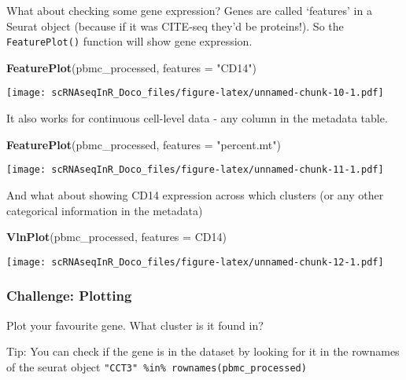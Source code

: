 \documentclass[
]{book}
\newenvironment{Shaded}{\begin{snugshade}}{\end{snugshade}}
\newcommand{\AttributeTok}[1]{\textcolor[rgb]{0.13,0.29,0.53}{#1}}
\newcommand{\FunctionTok}[1]{\textcolor[rgb]{0.13,0.29,0.53}{\textbf{#1}}}
\newcommand{\NormalTok}[1]{#1}
\newcommand{\StringTok}[1]{\textcolor[rgb]{0.31,0.60,0.02}{#1}}
\begin{document}
What about checking some gene expression? Genes are called `features' in a Seurat object (because if it was CITE-seq they'd be proteins!). So the \texttt{FeaturePlot()} function will show gene expression.

\begin{Shaded}
\begin{Highlighting}[]
\FunctionTok{FeaturePlot}\NormalTok{(pbmc\_processed, }\AttributeTok{features =}  \StringTok{"CD14"}\NormalTok{)}
\end{Highlighting}
\end{Shaded}

\texttt{[image: scRNAseqInR\_Doco\_files/figure-latex/unnamed-chunk-10-1.pdf]}

It also works for continuous cell-level data - any column in the metadata table.

\begin{Shaded}
\begin{Highlighting}[]
\FunctionTok{FeaturePlot}\NormalTok{(pbmc\_processed, }\AttributeTok{features =}  \StringTok{"percent.mt"}\NormalTok{)}
\end{Highlighting}
\end{Shaded}

\texttt{[image: scRNAseqInR\_Doco\_files/figure-latex/unnamed-chunk-11-1.pdf]}

And what about showing CD14 expression across which clusters (or any other categorical information in the metadata)

\begin{Shaded}
\begin{Highlighting}[]
\FunctionTok{VlnPlot}\NormalTok{(pbmc\_processed, }\AttributeTok{features =} \StringTok{\textquotesingle{}CD14\textquotesingle{}}\NormalTok{)}
\end{Highlighting}
\end{Shaded}

\texttt{[image: scRNAseqInR\_Doco\_files/figure-latex/unnamed-chunk-12-1.pdf]}

\hypertarget{challenge-plotting}{%
\subsubsection*{Challenge: Plotting}\label{challenge-plotting}}

Plot your favourite gene. What cluster is it found in?

Tip: You can check if the gene is in the dataset by looking for it in the rownames of the seurat object \texttt{"CCT3"\ \%in\%\ rownames(pbmc\_processed)}
\end{document}
